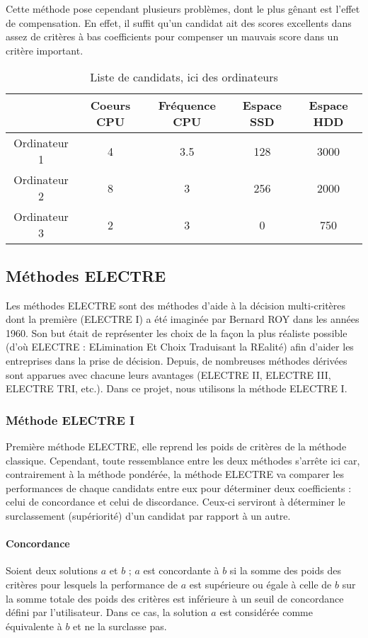 \documentclass[a4paper]{article}
\begin{document}
Cette méthode pose cependant plusieurs problèmes, dont le plus gênant est l'effet de compensation. En effet, il suffit qu'un candidat ait des scores excellents dans assez de critères à bas coefficients pour compenser un mauvais score dans un critère important.

\begin{table}[!ht]
\begin{tabular}{|c|c|c|c|c|}
  \hline
  \hphantom & Coeurs CPU & Fréquence CPU & Espace SSD &  Espace HDD \\
  \hline
  Ordinateur 1 & 4 & 3.5 & 128 & 3000 \\
  Ordinateur 2 & 8 & 3 & 256 &	2000 \\
  Ordinateur 3 & 2 & 3 & 0 & 750 \\
  \hline
\end{tabular}
\caption{Liste de candidats, ici des ordinateurs}
\end{table}

\newpage

\subsection{Méthodes ELECTRE}

Les méthodes ELECTRE sont des méthodes d'aide à la décision multi-critères dont la première (ELECTRE I) a été imaginée par Bernard ROY dans les années 1960. Son but était de représenter les choix de la façon la plus réaliste possible (d'où ELECTRE : ELimination Et Choix Traduisant la REalité) afin d'aider les entreprises dans la prise de décision. Depuis, de nombreuses méthodes dérivées sont apparues avec chacune leurs avantages (ELECTRE II, ELECTRE III, ELECTRE TRI, etc.). Dans ce projet, nous utilisons la méthode ELECTRE I.

\subsubsection{Méthode ELECTRE I}

Première méthode ELECTRE, elle reprend les poids de critères de la méthode classique. Cependant, toute ressemblance entre les deux méthodes s'arrête ici car, contrairement à la méthode pondérée, la méthode ELECTRE va comparer les performances de chaque candidats entre eux pour déterminer deux coefficients : celui de concordance et celui de discordance. Ceux-ci serviront à déterminer le surclassement (supériorité) d'un candidat par rapport à un autre.

\paragraph{Concordance}
Soient deux solutions \(a\) et \(b\) ; \(a\) est concordante à \(b\) si la somme des poids des critères pour lesquels la performance de \(a\) est supérieure ou égale à celle de \(b\) sur la somme totale des poids des critères est inférieure à un seuil de concordance défini par l'utilisateur. Dans ce cas, la solution \(a\) est considérée comme équivalente à \(b\) et ne la surclasse pas.
\end{document}
